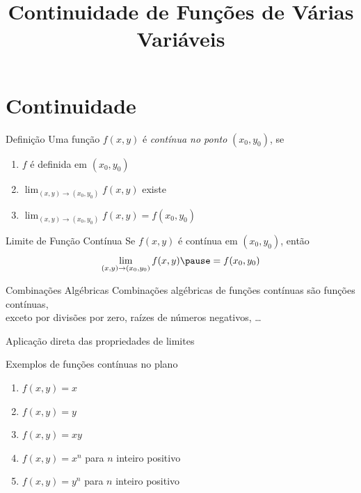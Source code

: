 \documentclass[fleqn,utf8,aspectratio=169,12pt,ignorenonframetext]{beamer}
\title{Continuidade de Funções de Várias Variáveis}
\begin{document}
\addtitle

\section{Continuidade}

\begin{frame}{Definição}
  Uma função \(f(x, y)\) é \emph{contínua no ponto} $(x_0, y_0)$, se

  \vspace{0.5\baselineskip}
  \begin{enumerate}[<+->]
    \setlength\itemsep{1.5em}
    \item $f$ é definida em \((x_0, y_0)\)
    \item \(\lim_{(x, y)\to(x_0, y_0)} f(x, y)\) existe
    \item \(\lim_{(x, y)\to(x_0, y_0)} f(x, y) = f(x_0, y_0)\)
  \end{enumerate}

  \vspace{\baselineskip}
\end{frame}

\begin{frame}{Limite de Função Contínua}
  Se \(f(x, y)\) é contínua em $(x_0, y_0)$,
  \pause
  então
  \[
    \lim_{(x, y)\to(x_0, y_0)} f(x, y) \pause = f(x_0, y_0)
  \]
\end{frame}

\begin{frame}{Combinações Algébricas}
  Combinações algébricas de funções contínuas são funções contínuas, \\
  exceto por divisões por zero, raízes de números negativos, \dots

  \pause
  \vspace{\baselineskip}
  Aplicação direta das propriedades de limites
\end{frame}

\begin{question}
  Exemplos de funções contínuas no plano
  \begin{enumerate}[<+->]
    \item \(f(x, y) = x\)
    \item \(f(x, y) = y\)
    \item \(f(x, y) = xy\)
    \item \(f(x, y) = x^n\) para $n$ inteiro positivo
    \item \(f(x, y) = y^n\) para $n$ inteiro positivo
  \end{enumerate}
\end{question}
\end{document}
